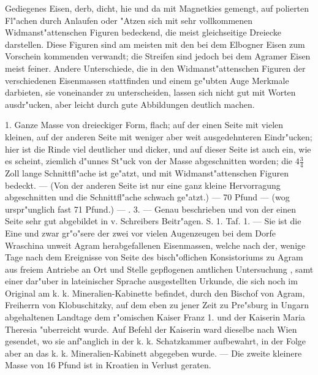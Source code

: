 \documentclass[a4paper, 11pt, oneside, polutonikogreek, german]{article}
\begin{document}
Gediegenes Eisen, derb, dicht, hie und da mit Magnetkies gemengt, auf polierten Fl"achen durch Anlaufen oder "Atzen sich mit sehr vollkommenen Widmanst"attenschen Figuren bedeckend, die meist gleichseitige Dreiecke darstellen. Diese Figuren sind am meisten mit den bei dem Elbogner Eisen zum Vorschein kommenden verwandt; die Streifen sind jedoch bei dem Agramer Eisen meist feiner. Andere Unterschiede, die in den Widmanst"attenschen Figuren der verschiedenen Eisenmassen stattfinden und einem ge"ubten Auge Merkmale darbieten, sie voneinander zu unterscheiden, lassen sich nicht gut mit Worten ausdr"ucken, aber leicht durch gute Abbildungen deutlich machen.

1. Ganze Masse von dreieckiger Form, flach; auf der einen Seite mit vielen kleinen, auf der anderen Seite mit weniger aber weit ausgedehnteren Eindr"ucken; hier ist die Rinde viel deutlicher und dicker, und auf dieser Seite ist auch ein, wie es scheint, ziemlich d"unnes St"uck von der Masse abgeschnitten worden; die $\mathfrak{4\frac{3}{4}}$ Zoll lange Schnittfl"ache ist ge"atzt, und mit Widmanst"attenschen Figuren bedeckt. --- (Von der anderen Seite ist nur eine ganz kleine Hervorragung abgeschnitten und die Schnittfl"ache schwach ge"atzt.) --- 70 Pfund --- (wog urspr"unglich fast 71 Pfund.) --- . 3. --- Genau beschrieben und von der einen Seite sehr gut abgebildet in v. Schreibers Beitr"agen. S. 1. Taf. 1. --- Sie ist die Eine und zwar gr"o"sere der zwei vor vielen Augenzeugen bei dem Dorfe Wraschina unweit Agram herabgefallenen Eisenmassen, welche nach der, wenige Tage nach dem Ereignisse von Seite des bisch"oflichen Konsistoriums zu Agram aus freiem Antriebe an Ort und Stelle gepflogenen amtlichen Untersuchung , samt einer dar"uber in lateinischer Sprache ausgestellten Urkunde, die sich noch im Original am k. k. Mineralien-Kabinette befindet, durch den Bischof von Agram, Freiherrn von Klobuschitzky, auf dem eben zu jener Zeit zu Pre"sburg in Ungarn abgehaltenen Landtage dem r"omischen Kaiser Franz 1. und der Kaiserin Maria Theresia "uberreicht wurde. Auf Befehl der Kaiserin ward dieselbe nach Wien gesendet, wo sie anf"anglich in der k. k. Schatzkammer aufbewahrt, in der Folge aber an das k. k. Mineralien-Kabinett abgegeben wurde. --- Die zweite kleinere Masse von 16 Pfund ist in Kroatien in Verlust geraten.

\setlength{\leftskip}{10mm}
\setlength{\parindent}{0pt}
\end{document}
